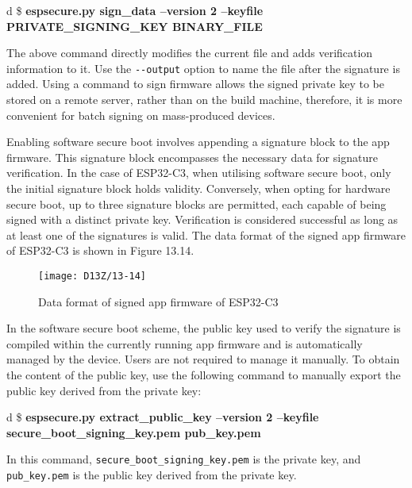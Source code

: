 \documentclass[a4paper,12pt]{book}
\begin{document}
\begin{codebloc}
\begin{tabular}{d}
\$ \textbf{espsecure.py sign\_data --version 2 --keyfile PRIVATE\_SIGNING\_KEY BINARY\_FILE}
\end{tabular}
\end{codebloc}

The above command directly modifies the current file and adds verification information to it. Use the \verb|--output| option to name the file after the signature is added. Using a command to sign firmware allows the signed private key to be stored on a remote server, rather than on the build machine, therefore, it is more convenient for batch signing on mass-produced devices.

Enabling software secure boot involves appending a signature block to the app firmware. This signature block encompasses the necessary data for signature verification. In the case of ESP32-C3, when utilising software secure boot, only the initial signature block holds validity. Conversely, when opting for hardware secure boot, up to three signature blocks are permitted, each capable of being signed with a distinct private key. Verification is considered successful as long as at least one of the signatures is valid. The data format of the signed app firmware of ESP32-C3 is shown in Figure 13.14.

\begin{figure}[!h]
    \centering
    \texttt{[image: D13Z/13-14]}
    \caption{Data format of signed app firmware of ESP32-C3}
\end{figure}

In the software secure boot scheme, the public key used to verify the signature is compiled within the currently running app firmware and is automatically managed by the device. Users are not required to manage it manually. To obtain the content of the public key, use the following command to manually export the public key derived from the private key:

\begin{codebloc}
\begin{tabular}{d}
\$ \textbf{espsecure.py extract\_public\_key --version 2 --keyfile secure\_boot\_signing\_key.\newline pem pub\_key.pem}
\end{tabular}
\end{codebloc}

In this command, \verb|secure_boot_signing_key.pem| is the private key, and \verb|pub_key.pem| is the public key derived from the private key.
\end{document}
